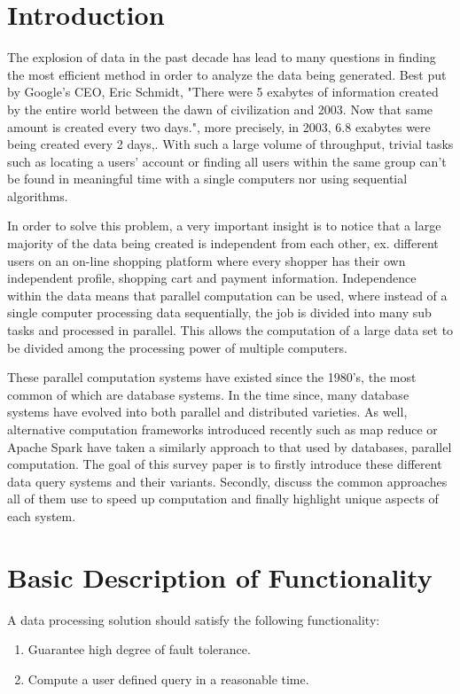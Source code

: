 \documentclass[10pt,twocolumn]{IEEEtran11}
\begin{document}
\section{Introduction}
The explosion of data in the past decade has lead to many questions in finding the most efficient method in order to analyze the data being generated. Best put by Google's CEO, Eric Schmidt, "There were 5 exabytes of information created by the entire world between the dawn of civilization and 2003. Now that same amount is created every two days.", more precisely, in 2003, 6.8 exabytes were being created every 2 days,\cite{gantz2010digital}.  With such a large volume of throughput, trivial tasks such as locating a users' account or finding all users within the same group can't be found in meaningful time with a single computers nor using sequential algorithms.
\par
In order to solve this problem, a very important insight is to notice that a large majority of the data being created is independent from each other, ex. different users on an on-line shopping platform where every shopper has their own independent profile, shopping cart and payment information.  Independence within the data means that parallel computation can be used, where instead of a single computer processing data sequentially, the job is divided into many sub tasks and processed in parallel.  This allows the computation of a large data set to be divided among the processing power of multiple computers.
\par
These parallel computation systems have existed since the 1980's, the most common of which are database systems. In the time since, many database systems have evolved into both parallel and distributed varieties.  As well, alternative computation frameworks introduced recently such as map reduce or Apache Spark have taken a  similarly approach to that used by databases, parallel computation.  The goal of this survey paper is to firstly introduce these different data query systems and their variants.  Secondly, discuss the common approaches all of them use to speed up computation and finally highlight unique aspects of each system.

\section{Basic Description of Functionality}

A data processing solution should satisfy the following functionality:
\begin{enumerate}	
\setlength\itemsep{1em}
	\item Guarantee high degree of fault tolerance.
	\item Compute a user defined query in a reasonable time.
\end{enumerate}
\end{document}
